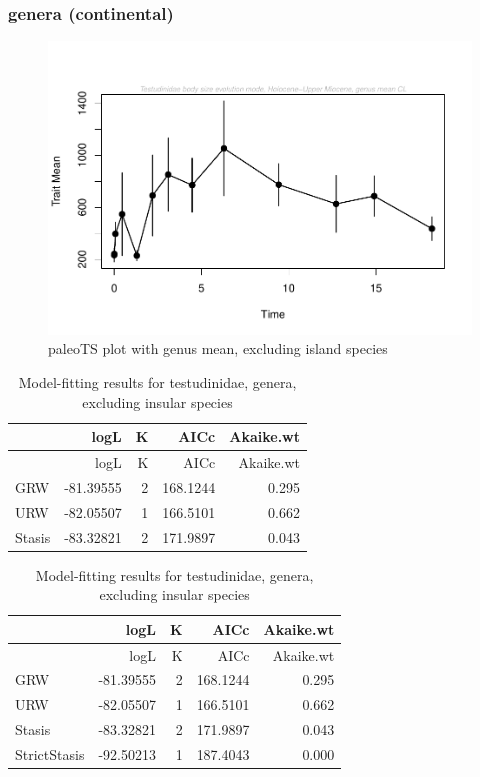 \documentclass[]{article}
\begin{document}
\subsubsection{genera (continental)}\label{genera-continental}

\begin{figure}[htbp]
\centering
\includegraphics{MA_JJ_files/figure-latex/paleoTS plot with genus mean, excluding island species-1.pdf}
\caption{paleoTS plot with genus mean, excluding island species}
\end{figure}

\begin{longtable}[]{@{}lrrrr@{}}
\caption{Model-fitting results for testudinidae, genera, excluding
insular species}\tabularnewline
\toprule
& logL & K & AICc & Akaike.wt\tabularnewline
\midrule
\endfirsthead
\toprule
& logL & K & AICc & Akaike.wt\tabularnewline
\midrule
\endhead
GRW & -81.39555 & 2 & 168.1244 & 0.295\tabularnewline
URW & -82.05507 & 1 & 166.5101 & 0.662\tabularnewline
Stasis & -83.32821 & 2 & 171.9897 & 0.043\tabularnewline
\bottomrule
\end{longtable}

\begin{longtable}[]{@{}lrrrr@{}}
\caption{Model-fitting results for testudinidae, genera, excluding
insular species}\tabularnewline
\toprule
& logL & K & AICc & Akaike.wt\tabularnewline
\midrule
\endfirsthead
\toprule
& logL & K & AICc & Akaike.wt\tabularnewline
\midrule
\endhead
GRW & -81.39555 & 2 & 168.1244 & 0.295\tabularnewline
URW & -82.05507 & 1 & 166.5101 & 0.662\tabularnewline
Stasis & -83.32821 & 2 & 171.9897 & 0.043\tabularnewline
StrictStasis & -92.50213 & 1 & 187.4043 & 0.000\tabularnewline
\bottomrule
\end{longtable}
\end{document}
